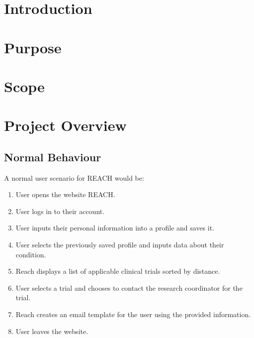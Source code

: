 \documentclass[12pt, titlepage]{article}
\begin{document}
\tableofcontents

\newpage

\listoftables

\listoffigures

\newpage


\section{Introduction}


\section{Purpose}



\section{Scope}


\section{Project Overview}

\subsection{Normal Behaviour}

A normal user scenario for REACH would be:

\begin{enumerate}
  \item User opens the website REACH.

  \item User logs in to their account.

  \item User inputs their personal information into a profile and saves it.
  
  \item User selects the previously saved profile and inputs data about their condition.
  
  \item Reach displays a list of applicable clinical trials sorted by distance.
  
  \item User selects a trial and chooses to contact the research coordinator for the trial.
  
  \item Reach creates an email template for the user using the provided information.
  
  \item User leaves the website.
\end{enumerate}
\end{document}
